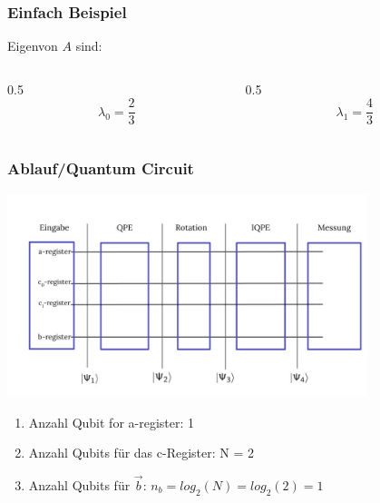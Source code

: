 \begin{frame}
    \frametitle{Einfach Beispiel}

    Eigenvon $A$ sind:    
    \begin{columns}[c]
        \begin{column}{0.5\hsize}\centering
            $$\lambda_0 = \frac{2}{3}$$
        \end{column}

        \begin{column}{0.5\hsize}
            $$\lambda_1 = \frac{4}{3}$$
        \end{column}
    \end{columns}

    \hfil

    \hfil


    \hfil

    \hfil


\end{frame}




\begin{frame}
    \frametitle{Ablauf/Quantum Circuit}

    \begin{center}
    \includegraphics[width=10.5cm]{img/example_circuit/example_circuit.jpg}
    \end{center}

    \begin{enumerate}
        \item Anzahl Qubit for a-register: 1
        \item Anzahl Qubits für das c-Register: N = 2
        \item Anzahl Qubits für $\vec{b}$: $n_b = log_2(N) = log_2 (2) = 1$ 
    \end{enumerate}
\end{frame}

